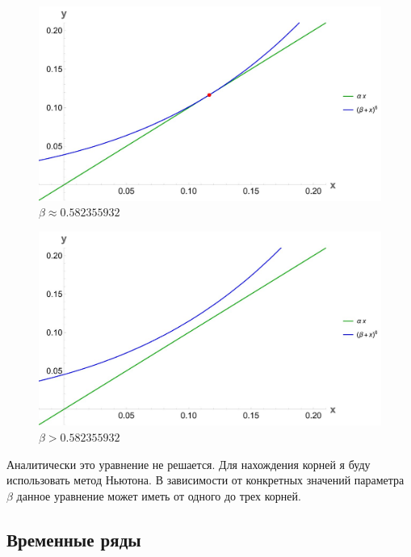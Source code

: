         \begin{figure}
            \centering
            \includegraphics[width=\textwidth]{images/main_touch.jpg}

            \captionsetup{justification=centering}
            \caption{\(\beta \approx 0.582355932\)}
            \label{mainTouch}
        \end{figure}

        \begin{figure}
            \centering
            \includegraphics[width=\textwidth]{images/main_over.jpg}

            \captionsetup{justification=centering}
            \caption{\(\beta > 0.582355932\)}
            \label{mainOver}
        \end{figure}

        Аналитически это уравнение не решается. Для нахождения корней я буду использовать метод Ньютона. В зависимости от конкретных значений параметра \(\beta\) данное уравнение может иметь от одного до трех корней.

    \subsection{Временные ряды}

